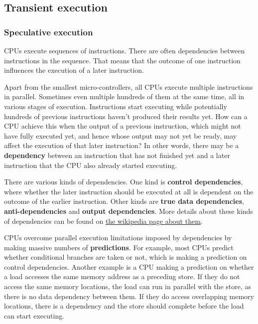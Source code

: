 \documentclass[
  a4paper,
]{report}
\begin{document}
\subsection{Transient execution}\label{transient-execution}

\subsubsection{Speculative execution}\label{speculative-execution}

CPUs execute sequences of instructions. There are often dependencies
between instructions in the sequence. That means that the outcome of one
instruction influences the execution of a later instruction.

Apart from the smallest micro-controllers, all CPUs execute multiple
instructions in parallel. Sometimes even multiple hundreds of them at
the same time, all in various stages of execution. Instructions start
executing while potentially hundreds of previous instructions haven't
produced their results yet. How can a CPU achieve this when the output
of a previous instruction, which might not have fully executed yet, and
hence whose output may not yet be ready, may affect the execution of
that later instruction? In other words, there may be a
\textbf{dependency} between an instruction that has not finished yet and
a later instruction that the CPU also already started executing.

There are various kinds of dependencies. One kind is
\textbf{\label{__index_entry_166}{control
dependencies}}, where whether the later
instruction should be executed at all is dependent on the outcome of the
earlier instruction. Other kinds are
\textbf{\label{__index_entry_167}{true data
dependencies}},
\textbf{\label{__index_entry_168}{anti-dependencies}}
and \textbf{\label{__index_entry_169}{output
dependencies}}. More details about these kinds
of dependencies can be found on
\href{https://en.wikipedia.org/wiki/Data_dependency}{the wikipedia page
about them}.

CPUs overcome parallel execution limitations imposed by dependencies by
making massive numbers of
\textbf{\label{__index_entry_170}{predictions}}.
For example, most CPUs predict whether conditional branches are taken or
not, which is making a prediction on control dependencies. Another
example is a CPU making a prediction on whether a load accesses the same
memory address as a preceding store. If they do not access the same
memory locations, the load can run in parallel with the store, as there
is no data dependency between them. If they do access overlapping memory
locations, there is a dependency and the store should complete before
the load can start executing.
\end{document}
